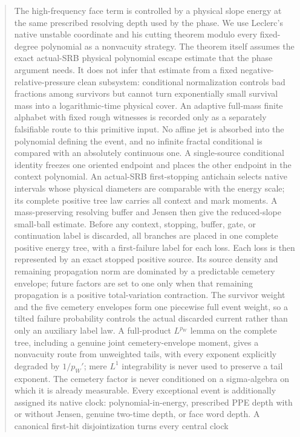 \documentclass[11pt]{article}
\begin{document}
\begin{abstract}
The high-frequency face term is controlled by a physical slope energy at the
same prescribed resolving depth used by the phase.  We
use Leclerc's native unstable coordinate and his cutting theorem modulo every
fixed-degree polynomial as a nonvacuity strategy.  The theorem itself assumes
the exact actual-SRB physical polynomial escape estimate that the phase
argument needs.  It does not infer that estimate from a fixed
negative-relative-pressure clean subsystem: conditional normalization
controls bad fractions among survivors but cannot turn exponentially small
survival mass into a logarithmic-time physical cover.  An adaptive
full-mass finite alphabet with fixed rough witnesses is recorded only as a
separately falsifiable route to this primitive input.  No affine jet is absorbed into the polynomial
defining the event, and no infinite fractal conditional is compared with an
absolutely continuous one.  A single-source
conditional identity freezes one oriented endpoint and places the other
endpoint in the context polynomial.  An actual-SRB first-stopping antichain
selects native intervals whose physical diameters are comparable with the
energy scale; its complete positive tree law carries all context and mark moments.
A mass-preserving resolving buffer and Jensen then give the reduced-slope
small-ball estimate.  Before any context, stopping, buffer, gate, or
continuation label is discarded, all branches are placed in one complete
positive energy tree, with a first-failure label for each loss.  Each loss is
then represented by an exact stopped positive source.  Its source density and
remaining propagation norm are dominated by a predictable cemetery envelope;
future factors are set to one only when that remaining propagation is a
positive total-variation contraction.  The survivor weight and the five
cemetery envelopes form one piecewise full event weight, so a tilted failure
probability controls the actual discarded current rather than only an
auxiliary label law.  A full-product $L^{p_W}$ lemma on the complete tree,
including a genuine joint cemetery-envelope moment, gives a nonvacuity route from unweighted tails,
with every exponent explicitly degraded by $1/p_W'$; mere $L^1$
integrability is never used to preserve a tail exponent.  The cemetery factor
is never conditioned on a sigma-algebra on which it is already measurable.
Every exceptional event is additionally assigned its native clock: polynomial-in-energy,
prescribed PPE depth with or without Jensen, genuine two-time depth, or face
word depth.  A canonical first-hit disjointization turns every central clock

\end{abstract}
\end{document}
